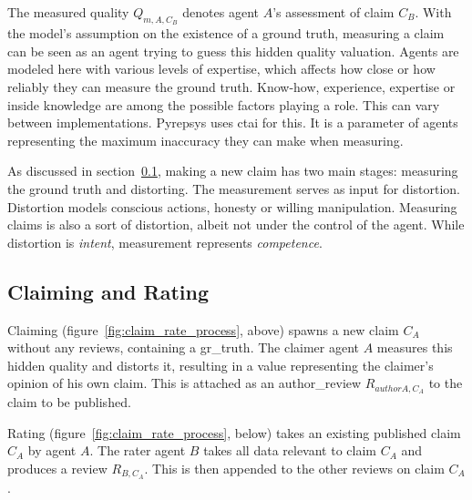 \documentclass[%
    ]{\PathToTumTemplate/thesis/tum_thesis}
\begin{document}
The measured quality $Q_{m,A,C_{B}}$ denotes agent $A$'s assessment of claim $C_B$.
With the model's assumption on the existence of a ground truth, measuring a claim can be seen as an agent trying to guess this hidden quality valuation.
Agents are modeled here with various levels of expertise, which affects how close or how reliably they can measure the ground truth.
Know-how, experience, expertise or inside knowledge are among the possible factors playing a role.
This can vary between implementations.
Pyrepsys uses \acrlong{ctai} for this.
It is a parameter of agents representing the maximum inaccuracy they can make when measuring.

As discussed in section~\ref{sec:appr_claim_rate_process}, making a new claim has two main stages: measuring the ground truth and distorting.
The measurement serves as input for distortion.
Distortion models conscious actions, honesty or willing manipulation.
Measuring claims is also a sort of distortion, albeit not under the control of the agent.
While distortion is \emph{intent}, measurement represents \emph{competence}.


\subsection{Claiming and Rating}\label{sec:appr_claim_rate_process}
Claiming (figure~\ref{fig:claim_rate_process}, above) spawns a new claim $C_A$ without any reviews, containing a \gls{gr_truth}.
The claimer agent $A$ measures this hidden quality and distorts it, resulting in a value representing the claimer's opinion of his own claim.
This is attached as an \gls{author_review} $R_{authorA,C_{A}}$ to the claim to be published.

Rating (figure~\ref{fig:claim_rate_process}, below) takes an existing published claim $C_A$ by agent $A$.
The rater agent $B$ takes all data relevant to claim $C_A$ and produces a \gls{review} $R_{B,C_{A}}$.
This is then appended to the other reviews on claim $C_A$.
\end{document}
